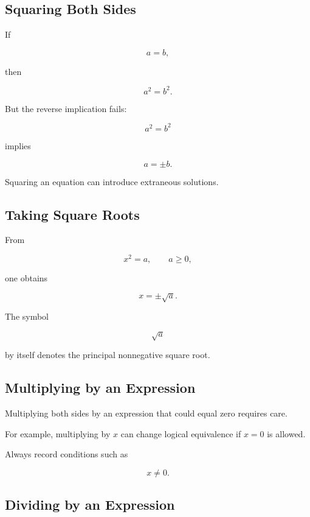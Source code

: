 \subsection{Squaring Both Sides}
\label{subsec:squaring-both-sides-warning}

If

\[
a=b,
\]

then

\[
a^2=b^2.
\]

But the reverse implication fails:

\[
a^2=b^2
\]

implies

\[
\boxed{
a=\pm b.
}
\]

Squaring an equation can introduce extraneous solutions.

\subsection{Taking Square Roots}
\label{subsec:taking-square-roots-warning}

From

\[
x^2=a,
\qquad
a\geq0,
\]

one obtains

\[
\boxed{
x=\pm\sqrt a.
}
\]

The symbol

\[
\sqrt a
\]

by itself denotes the principal nonnegative square root.

\subsection{Multiplying by an Expression}
\label{subsec:multiplying-expression-domain-warning}

Multiplying both sides by an expression that could equal zero requires care.

For example, multiplying by \(x\) can change logical equivalence if \(x=0\)
is allowed.

Always record conditions such as

\[
\boxed{
x\neq0.
}
\]

\subsection{Dividing by an Expression}
\label{subsec:dividing-expression-warning}

